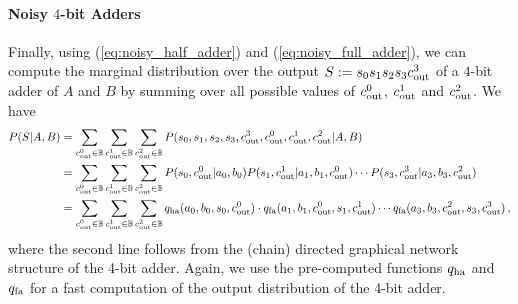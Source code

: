 \paragraph{Noisy $4$-bit Adders} Finally, using (\ref{eq:noisy_half_adder}) and (\ref{eq:noisy_full_adder}), we can compute the marginal distribution over the output $S:=s_0s_1s_2s_3c_{\mathrm{out}}^3$ of a $4$-bit adder of $A$ and $B$ by summing over all possible values of $c_{\mathrm{out}}^0$, $c_{\mathrm{out}}^1$ and $c_{\mathrm{out}}^2$. We have
\begin{align}
    P(S|A,B) & = \sum_{c_{\mathrm{out}}^0 \in \mathbb{B}} \sum_{c_{\mathrm{out}}^1\in\mathbb{B}} \sum_{c_{\mathrm{out}}^2\in\mathbb{B}} P(s_0,s_1,s_2,s_3,c_{\mathrm{out}}^3,c_{\mathrm{out}}^0,c_{\mathrm{out}}^1,c_{\mathrm{out}}^2|A,B) \nonumber                                                          \\
             & = \sum_{c_{\mathrm{out}}^0 \in \mathbb{B}} \sum_{c_{\mathrm{out}}^1\in\mathbb{B}} \sum_{c_{\mathrm{out}}^2\in\mathbb{B}} P(s_0,c_{\mathrm{out}}^0|a_0,b_0)P(s_1,c_{\mathrm{out}}^1|a_1,b_1,c_{\mathrm{out}}^0)\cdots P(s_3,c_{\mathrm{out}}^3|a_3,b_3,c_{\mathrm{out}}^2) \nonumber                       \\
             & = \sum_{c_{\mathrm{out}}^0 \in \mathbb{B}} \sum_{c_{\mathrm{out}}^1\in\mathbb{B}} \sum_{c_{\mathrm{out}}^2\in\mathbb{B}} q_{\mathrm{ha}}(a_0,b_0,s_0,c_{\mathrm{out}}^0)\cdot q_{\mathrm{fa}}(a_1,b_1,c_{\mathrm{out}}^0,s_1,c_{\mathrm{out}}^1)\cdots q_{\mathrm{fa}}(a_3,b_3,c_{\mathrm{out}}^2,s_3,c_{\mathrm{out}}^3) \nonumber \,,
\end{align}
where the second line follows from the (chain) directed graphical network structure of the 4-bit adder. Again, we use the  pre-computed functions $q_{\mathrm{ha}}$ and $q_{\mathrm{fa}}$ for a fast computation of the output distribution of the 4-bit adder.

